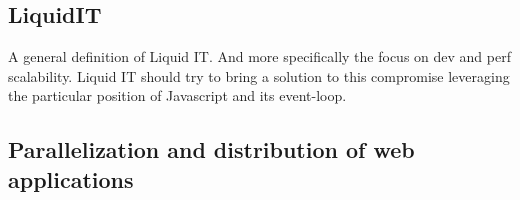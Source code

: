\subsection{LiquidIT}

A general definition of Liquid IT.
And more specifically the focus on dev and perf scalability.
Liquid IT should try to bring a solution to this compromise leveraging the particular position of Javascript and its event-loop.


\subsection{Parallelization and distribution of web applications}


\subsection{}




                                    \endinput


Some links I NEED to put :
--------------------------

https://glyph.twistedmatrix.com/2014/02/unyielding.html
http://calculist.org/blog/2011/12/14/why-coroutines-wont-work-on-the-web/


Some chunks I might find useful later :
---------------------------------------

\cit{No matter how great the talent or efforts, some things just take time. You can't produce a baby in one month by getting nine women pregnant.}
{Warren Buffett}

A good example of declarative sentence in everyday world : in case of fire, 
the elevators don't work -> you understand that you need to take the stairs.

The purpose of explicit synchronization is to manage the timing of side-effects in the presence of parallelism. 

A function is side-effect free if it is referentially transparent.




Why is that cooking recipe are inehrently and easily parallel, while it is a lot more difficult to write parallel programs ?

